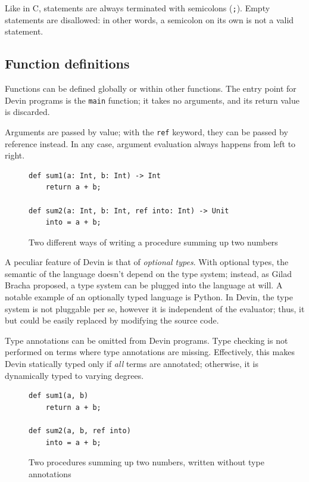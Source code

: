 \documentclass[11pt, american, draft]{PhdThesis}
\begin{document}
  Like in C, statements are always terminated with semicolons (\verb$;$). Empty statements are
  disallowed: in other words, a semicolon on its own is not a valid statement.

  \subsection{Function definitions}

  Functions can be defined globally or within other functions. The entry point for Devin programs is
  the \verb$main$ function; it takes no arguments, and its return value is discarded.

  Arguments are passed by value; with the \texttt{ref} keyword, they can be passed by reference
  instead. In any case, argument evaluation always happens from left to right.

  \begin{figure}[H]
    \center

\begin{verbatim}
def sum1(a: Int, b: Int) -> Int
    return a + b;

def sum2(a: Int, b: Int, ref into: Int) -> Unit
    into = a + b;
\end{verbatim}

    \caption{Two different ways of writing a procedure summing up two numbers}
  \end{figure}

  A peculiar feature of Devin is that of \emph{optional types}. With optional types, the semantic of
  the language doesn't depend on the type system; instead, as Gilad Bracha proposed\cite{bracha}, a
  type system can be plugged into the language at will. A notable example of an optionally typed
  language is Python. In Devin, the type system is not pluggable per se, however it is independent
  of the evaluator; thus, it but could be easily replaced by modifying the source code.

  Type annotations can be omitted from Devin programs. Type checking is not performed on terms where
  type annotations are missing. Effectively, this makes Devin statically typed only if \emph{all}
  terms are annotated; otherwise, it is dynamically typed to varying degrees.

  \begin{figure}[H]
    \center

\begin{verbatim}
def sum1(a, b)
    return a + b;

def sum2(a, b, ref into)
    into = a + b;
\end{verbatim}

    \caption{Two procedures summing up two numbers, written without type annotations}
  \end{figure}
\end{document}
